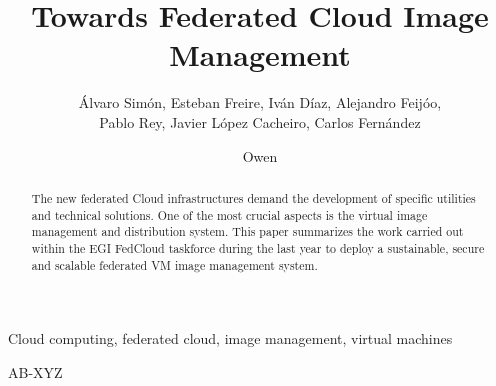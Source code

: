 \documentclass{cai}
\begin{document}
\label{firstpage}

\title[Towards Federated Cloud Image Management]
      {Towards Federated Cloud Image Management}

\author[A. Sim\'on, E. Freire, I. D\'iaz, A. Feij\'oo, P. Rey, J. Cacheiro, C. Fern\'andez]
       {\'Alvaro Sim\'on, Esteban Freire, Iv\'an D\'iaz, Alejandro Feij\'oo, \\
Pablo Rey, Javier L\'opez Cacheiro, Carlos Fern\'andez}



\author[O. Synge]
       {Owen }





%
%

\noreceived{} \nocommunicated{}

\maketitle

\begin{abstract}
The new federated Cloud infrastructures demand the development of specific utilities and technical solutions. One of the most crucial aspects is the virtual image management and distribution system.
This paper summarizes the work carried out within the EGI FedCloud taskforce during the last year to deploy a sustainable, secure and scalable federated VM image management system.
\end{abstract}

\begin{keywords}
Cloud computing, federated cloud, image management, virtual machines
\end{keywords}

\begin{mathclass}
AB-XYZ
\end{mathclass}
\end{document}
